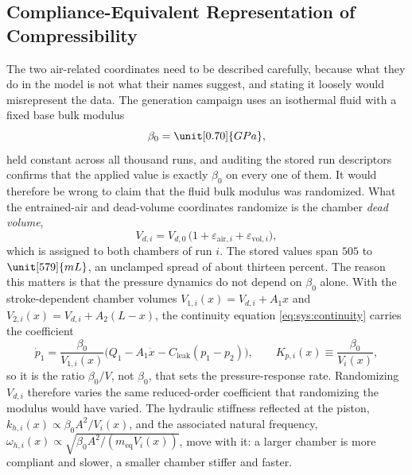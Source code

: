 \subsection{Compliance-Equivalent Representation of Compressibility}
\label{sec:data:compliance}

The two air-related coordinates need to be described carefully, because
what they do in the model is not what their names suggest, and stating it
loosely would misrepresent the data. The generation campaign uses an
isothermal fluid with a fixed base bulk modulus
%
\begin{equation}
  \label{eq:data:beta0}
  \beta_0 = \unit[0.70]{GPa},
\end{equation}
%
held constant across all thousand runs, and auditing the stored run
descriptors confirms that the applied value is exactly $\beta_0$ on
every one of them. It would therefore be wrong to claim that the fluid
bulk modulus was randomized. What the entrained-air and dead-volume coordinates randomize is the chamber \emph{dead volume},
%
\begin{equation}
  \label{eq:data:vdead}
  V_{d,i} = V_{d,0}\,\bigl(1 + \varepsilon_{\mathrm{air},i}
  + \varepsilon_{\mathrm{vol},i}\bigr),
\end{equation}
%
which is assigned to both chambers of run $i$. The stored values span
$505$ to $\unit[579]{mL}$, an unclamped spread of about thirteen
percent. The reason this matters is that the pressure dynamics do not
depend on $\beta_0$ alone. With the stroke-dependent chamber volumes
$V_{1,i}(x) = V_{d,i} + A_1 x$ and $V_{2,i}(x) = V_{d,i} + A_2 (L-x)$,
the continuity equation \eqref{eq:sys:continuity} carries the coefficient
%
\begin{equation}
  \label{eq:data:kp}
  \dot{p}_{1} = \frac{\beta_0}{V_{1,i}(x)}
  \bigl( Q_1 - A_1 \dot{x} - C_{\mathrm{leak}}(p_1 - p_2) \bigr),
  \qquad
  K_{p,i}(x) \equiv \frac{\beta_0}{V_{i}(x)},
\end{equation}
%
so it is the ratio $\beta_0/V$, not $\beta_0$, that sets the
pressure-response rate. Randomizing $V_{d,i}$ therefore varies the same
reduced-order coefficient that randomizing the modulus would have varied.
The hydraulic stiffness reflected at the piston, $k_{h,i}(x) \propto
\beta_0 A^2 / V_i(x)$, and the associated natural frequency,
$\omega_{h,i}(x) \propto \sqrt{\beta_0 A^2 / (m_{\mathrm{eq}}
V_i(x))}$, move with it: a larger chamber is more compliant and slower,
a smaller chamber stiffer and faster.


